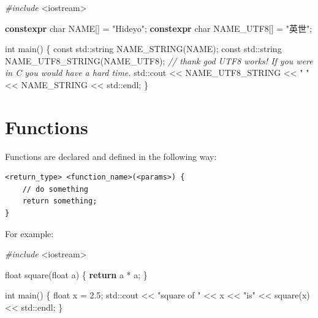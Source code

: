 \documentclass[
]{book}
\newenvironment{Shaded}{\begin{snugshade}}{\end{snugshade}}
\newcommand{\AttributeTok}[1]{\textcolor[rgb]{0.77,0.63,0.00}{#1}}
\newcommand{\BuiltInTok}[1]{#1}
\newcommand{\CommentTok}[1]{\textcolor[rgb]{0.56,0.35,0.01}{\textit{#1}}}
\newcommand{\ControlFlowTok}[1]{\textcolor[rgb]{0.13,0.29,0.53}{\textbf{#1}}}
\newcommand{\DataTypeTok}[1]{\textcolor[rgb]{0.13,0.29,0.53}{#1}}
\newcommand{\FloatTok}[1]{\textcolor[rgb]{0.00,0.00,0.81}{#1}}
\newcommand{\ImportTok}[1]{#1}
\newcommand{\KeywordTok}[1]{\textcolor[rgb]{0.13,0.29,0.53}{\textbf{#1}}}
\newcommand{\NormalTok}[1]{#1}
\newcommand{\PreprocessorTok}[1]{\textcolor[rgb]{0.56,0.35,0.01}{\textit{#1}}}
\newcommand{\StringTok}[1]{\textcolor[rgb]{0.31,0.60,0.02}{#1}}
\begin{document}
\begin{Shaded}
\begin{Highlighting}[]
\PreprocessorTok{\#include }\ImportTok{\textless{}iostream\textgreater{}}

\KeywordTok{constexpr} \DataTypeTok{char}\NormalTok{ NAME[] = }\StringTok{"Hideyo"}\NormalTok{;}
\KeywordTok{constexpr} \DataTypeTok{char}\NormalTok{ NAME\_UTF8[] = }\StringTok{"英世"}\NormalTok{;}

\DataTypeTok{int}\NormalTok{ main()}
\NormalTok{\{}
    \AttributeTok{const} \BuiltInTok{std::}\NormalTok{string NAME\_STRING(NAME);}
    \AttributeTok{const} \BuiltInTok{std::}\NormalTok{string NAME\_UTF8\_STRING(NAME\_UTF8);}
    \CommentTok{// thank god UTF8 works! If you were in C you would have a hard time.}
    \BuiltInTok{std::}\NormalTok{cout \textless{}\textless{} NAME\_UTF8\_STRING \textless{}\textless{} }\StringTok{" "}\NormalTok{ \textless{}\textless{} NAME\_STRING \textless{}\textless{} }\BuiltInTok{std::}\NormalTok{endl;}
\NormalTok{\}}
\end{Highlighting}
\end{Shaded}

\hypertarget{functions}{%
\section{Functions}\label{functions}}

Functions are declared and defined in the following way:

\begin{verbatim}
<return_type> <function_name>(<params>) {
    // do something
    return something;
}
\end{verbatim}

For example:

\begin{Shaded}
\begin{Highlighting}[]
\PreprocessorTok{\#include }\ImportTok{\textless{}iostream\textgreater{}}

\DataTypeTok{float}\NormalTok{ square(}\DataTypeTok{float}\NormalTok{ a)}
\NormalTok{\{}
    \ControlFlowTok{return}\NormalTok{ a * a;}
\NormalTok{\}}

\DataTypeTok{int}\NormalTok{ main()}
\NormalTok{\{}
    \DataTypeTok{float}\NormalTok{ x = }\FloatTok{2.5}\NormalTok{;}
    \BuiltInTok{std::}\NormalTok{cout \textless{}\textless{} }\StringTok{"square of "}\NormalTok{ \textless{}\textless{} x \textless{}\textless{} }\StringTok{"is"}\NormalTok{ \textless{}\textless{} square(x) \textless{}\textless{} }\BuiltInTok{std::}\NormalTok{endl;}
\NormalTok{\}}
\end{Highlighting}
\end{Shaded}
\end{document}
